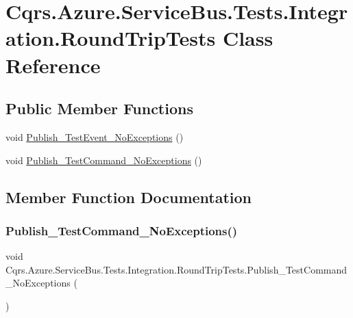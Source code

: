 \hypertarget{classCqrs_1_1Azure_1_1ServiceBus_1_1Tests_1_1Integration_1_1RoundTripTests}{}\section{Cqrs.\+Azure.\+Service\+Bus.\+Tests.\+Integration.\+Round\+Trip\+Tests Class Reference}
\label{classCqrs_1_1Azure_1_1ServiceBus_1_1Tests_1_1Integration_1_1RoundTripTests}
\subsection*{Public Member Functions}
\begin{DoxyCompactItemize}
\item 
void \hyperlink{classCqrs_1_1Azure_1_1ServiceBus_1_1Tests_1_1Integration_1_1RoundTripTests_a35eab43e8a250d844db0d3f5931394ae}{Publish\+\_\+\+Test\+Event\+\_\+\+No\+Exceptions} ()
\item 
void \hyperlink{classCqrs_1_1Azure_1_1ServiceBus_1_1Tests_1_1Integration_1_1RoundTripTests_a5f10c6d0a447991a5d689f17f54a87e5}{Publish\+\_\+\+Test\+Command\+\_\+\+No\+Exceptions} ()
\end{DoxyCompactItemize}


\subsection{Member Function Documentation}
\mbox{\label{classCqrs_1_1Azure_1_1ServiceBus_1_1Tests_1_1Integration_1_1RoundTripTests_a5f10c6d0a447991a5d689f17f54a87e5}} 
\subsubsection{\texorpdfstring{Publish\+\_\+\+Test\+Command\+\_\+\+No\+Exceptions()}{Publish\_TestCommand\_NoExceptions()}}
{\footnotesize\ttfamily void Cqrs.\+Azure.\+Service\+Bus.\+Tests.\+Integration.\+Round\+Trip\+Tests.\+Publish\+\_\+\+Test\+Command\+\_\+\+No\+Exceptions (\begin{DoxyParamCaption}{ }\end{DoxyParamCaption})}

